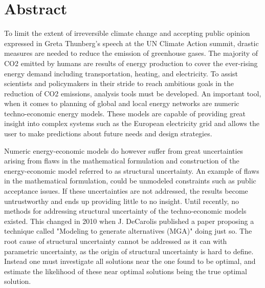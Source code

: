 
\chapter{Abstract}

\begin{adjustwidth}{-10pt}{-20pt}


To limit the extent of irreversible climate change and accepting public opinion expressed in Greta Thunberg's speech at the UN Climate Action summit, drastic measures are needed to reduce the emission of greenhouse gases. The majority of CO2 emitted by humans are results of energy production to cover the ever-rising energy demand including transportation, heating, and electricity. To assist scientists and policymakers in their stride to reach ambitious goals in the reduction of CO2 emissions, analysis tools must be developed. An important tool, when it comes to planning of global and local energy networks are numeric techno-economic energy models. These models are capable of providing great insight into complex systems such as the European electricity grid and allows the user to make predictions about future needs and design strategies. 

Numeric energy-economic models do however suffer from great uncertainties arising from flaws in the mathematical formulation and construction of the energy-economic model referred to as structural uncertainty. An example of flaws in the mathematical formulation, could be unmodeled constraints such as public acceptance issues.
If these uncertainties are not addressed, the results become untrustworthy and ends up providing little to no insight.
Until recently, no methods for addressing structural uncertainty of the techno-economic models existed. This changed in 2010 when J. DeCarolis published a paper proposing a technique called "Modeling to generate alternatives (MGA)" doing just so. The root cause of structural uncertainty cannot be addressed as it can with parametric uncertainty, as the origin of structural uncertainty is hard to define. Instead one must investigate all solutions near the one found to be optimal, and estimate the likelihood of these near optimal solutions being the true optimal solution. 


\end{adjustwidth}
